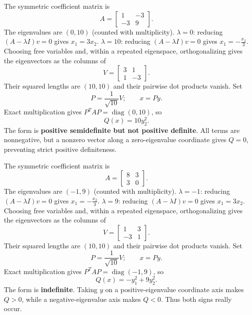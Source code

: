 The symmetric coefficient matrix is
\[
 A=\begin{bmatrix}1&-3\\-3&9\end{bmatrix}.
\]
The eigenvalues are $(0,10)$ (counted with multiplicity).
$\lambda=0$: reducing $(A-\lambda I)v=0$ gives
\( x_{1}=3 x_{2} \).
$\lambda=10$: reducing $(A-\lambda I)v=0$ gives
\( x_{1}=- \frac{x_{2}}{3} \).
Choosing free variables and, within a repeated eigenspace, orthogonalizing
gives the eigenvectors as the columns of
\[
 V=\begin{bmatrix}3&1\\1&-3\end{bmatrix}.
\]
Their squared lengths are $(10,10)$ and their pairwise dot products vanish. Set
\[
 P=\frac1{\sqrt{10}}V;\qquad x=Py.
\]
Exact multiplication gives $P^TAP=\operatorname{diag}(0,10)$, so
\[
 Q(x)=\boxed{10 y_{2}^{2}}.
\]
The form is \textbf{positive semidefinite but not positive definite}. All terms are nonnegative, but a nonzero vector along a zero-eigenvalue
coordinate gives $Q=0$, preventing strict positive definiteness.

The symmetric coefficient matrix is
\[
 A=\begin{bmatrix}8&3\\3&0\end{bmatrix}.
\]
The eigenvalues are $(-1,9)$ (counted with multiplicity).
$\lambda=-1$: reducing $(A-\lambda I)v=0$ gives
\( x_{1}=- \frac{x_{2}}{3} \).
$\lambda=9$: reducing $(A-\lambda I)v=0$ gives
\( x_{1}=3 x_{2} \).
Choosing free variables and, within a repeated eigenspace, orthogonalizing
gives the eigenvectors as the columns of
\[
 V=\begin{bmatrix}1&3\\-3&1\end{bmatrix}.
\]
Their squared lengths are $(10,10)$ and their pairwise dot products vanish. Set
\[
 P=\frac1{\sqrt{10}}V;\qquad x=Py.
\]
Exact multiplication gives $P^TAP=\operatorname{diag}(-1,9)$, so
\[
 Q(x)=\boxed{- y_{1}^{2} + 9 y_{2}^{2}}.
\]
The form is \textbf{indefinite}. Taking $y$ on a positive-eigenvalue coordinate axis makes $Q>0$,
while a negative-eigenvalue axis makes $Q<0$. Thus both signs really occur.

